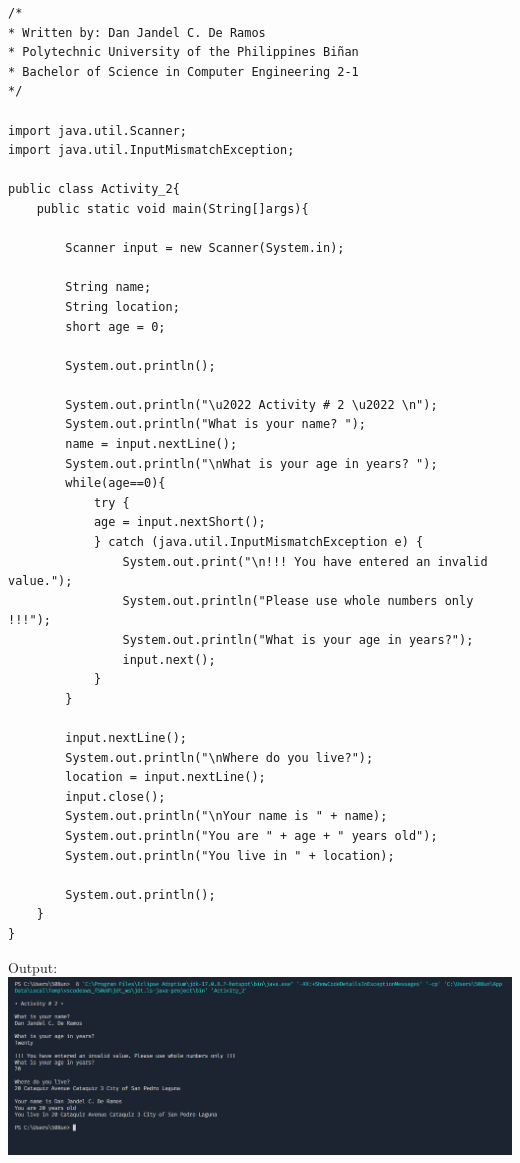 \documentclass[12pt]{article}
\begin{document}
	\begin{verbatim}         
/*
* Written by: Dan Jandel C. De Ramos
* Polytechnic University of the Philippines Biñan
* Bachelor of Science in Computer Engineering 2-1
*/
		
import java.util.Scanner;
import java.util.InputMismatchException;
		
public class Activity_2{
	public static void main(String[]args){
				
		Scanner input = new Scanner(System.in);
				
		String name;
		String location;
		short age = 0;
				
		System.out.println();
		
		System.out.println("\u2022 Activity # 2 \u2022 \n");
		System.out.println("What is your name? ");
		name = input.nextLine();
		System.out.println("\nWhat is your age in years? ");        
		while(age==0){            
			try {
			age = input.nextShort();
			} catch (java.util.InputMismatchException e) {            
				System.out.print("\n!!! You have entered an invalid value.");
				System.out.println("Please use whole numbers only !!!");  
				System.out.println("What is your age in years?");
				input.next();          
			}
		}
		
		input.nextLine();
		System.out.println("\nWhere do you live?");
		location = input.nextLine();
		input.close();
		System.out.println("\nYour name is " + name);
		System.out.println("You are " + age + " years old");
		System.out.println("You live in " + location);
	
		System.out.println();
	}
}
	\end{verbatim}
	\clearpage
	\noindent
	Output:\\
	\includegraphics[width=\textwidth]{output2nL}
\end{document}
